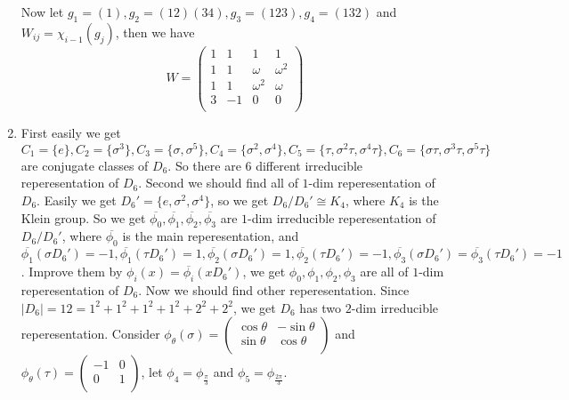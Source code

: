 \documentclass{ctexart}
\begin{document}
\begin{solution}
\begin{enumerate}
          Now let \(g_1 = ( 1),g_2 = ( 12)( 34),g_3 = ( 123),g_4=( 132) \) and \(W_{ij}=\chi_{i-1}( g_j)\), then we have
          \[
            W=\begin{pmatrix}
              1 & 1  & 1        & 1        \\
              1 & 1  & \omega   & \omega^2 \\
              1 & 1  & \omega^2 & \omega   \\
              3 & -1 & 0        & 0        \\
            \end{pmatrix}
          \]
    \item
          First easily we get \(C_1=\{ e\},C_2=\{ \sigma^3\},C_3=\{ \sigma,\sigma^5\},C_4=\{ \sigma^2,\sigma^4\},C_5=\{ \tau,\sigma^2 \tau,\sigma^4 \tau\},C_6=\{ \sigma \tau,\sigma^3 \tau,\sigma^5 \tau\}\) are conjugate classes of \(D_6\).
          So there are \(6\) different irreducible reperesentation of \(D_6\).
          Second we should find all of \(1\)-dim reperesentation of \(D_6\). 
          Easily we get \(D_6' = \{e,\sigma^2,\sigma^4 \}\), so we get \(D_6 / D_6' \cong K_4\), where \(K_4\) is the Klein group. 
          So we get \(\overline{\phi_0},\overline{\phi_1},\overline{\phi_2},\overline{\phi_3}\) are \(1\)-dim irreducible reperesentation of \(D_6 / D_6'\), where
          \(\overline{\phi_0}\) is the main reperesentation, and \(\overline{\phi_1}( \sigma D_6')=-1,\overline{\phi_1}( \tau D_6')=1,\overline{\phi_2}( \sigma D_6')=1,\overline{\phi_2}( \tau D_6')=-1,\overline{\phi_3}( \sigma D_6')=\overline{\phi_3}( \tau D_6')=-1\). 
          Improve them by \(\phi_i( x)=\overline{\phi_i}( x D_6')\), we get \(\phi_0,\phi_1,\phi_2,\phi_3\) are all of \(1\)-dim reperesentation of \(D_6\). 
          Now we should find other reperesentation. Since \(| D_6|=12=1^2+1^2+1^2+1^2+2^2+2^2\), we get \(D_6\) has two \(2\)-dim irreducible reperesentation. 
          Consider \(\phi_\theta( \sigma)=\begin{pmatrix}
            \cos \theta & -\sin \theta \\
            \sin \theta & \cos \theta  \\
            \end{pmatrix}\) and \(\phi_\theta( \tau)=\begin{pmatrix}
            -1 & 0 \\
            0  & 1 \\
          \end{pmatrix}\), let \(\phi_4=\phi_{\frac{\pi}{3}}\) and \(\phi_5=\phi_{\frac{2\pi}{3}}\). 

\end{enumerate}
\end{solution}
\end{document}
